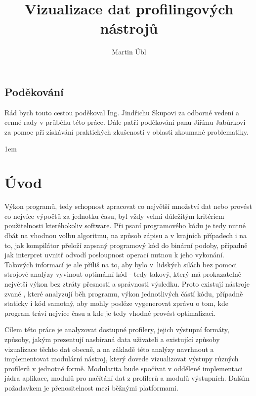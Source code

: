 \documentclass[czech,BP]{thesiskiv}
\author{Martin Úbl}
\title{Vizualizace dat profilingových nástrojů}
\begin{document}
\pagestyle{fancy}

\newcommand{\tick}{\ding{52}}
\newcommand{\tickcross}{\ding{55}}
\renewcommand{\chaptermark}[1]{\markboth{\textit{#1}}{}}
\renewcommand{\sectionmark}[1]{\markright{\textit{#1}}{}}
\cfoot{\thepage}
\lhead{\leftmark}
\rhead{\rightmark}
\maketitle

\thispagestyle{empty}
\section*{Poděkování}
Rád bych touto cestou poděkoval Ing. Jindřichu Skupovi za odborné vedení a cenné rady v průběhu této práce. Dále patří poděkování panu Jiřímu Jabůrkovi za pomoc při získávání praktických zkušeností v oblasti zkoumané problematiky.


\tableofcontents
\pagestyle{fancy}
\renewcommand{\chaptermark}[1]{\markboth{\textit{#1}}{}}
\renewcommand{\sectionmark}[1]{\markright{\textit{#1}}{}}
\cfoot{\thepage}
\lhead{\leftmark}
\rhead{\rightmark}
\parskip 1em

\newpage

\chapter{Úvod}
Výkon programů, tedy schopnost zpracovat co největší množství dat nebo provést co nejvíce výpočtů za jednotku času, byl vždy velmi důležitým kritériem použitelnosti kteréhokoliv software. Při psaní programového kódu je tedy nutné dbát na vhodnou volbu algoritmu, na způsob zápisu a v krajních případech i na to, jak kompilátor přeloží zapsaný programový kód do binární podoby, případně jak interpret uvnitř odvodí posloupnost operací nutnou k jeho vykonání. Takových informací je ale příliš na to, aby bylo v~lidských silách bez pomoci strojové analýzy vyvinout optimální kód - tedy takový, který má prokazatelně největší výkon bez ztráty přesnosti a správnosti výsledku. Proto existují nástroje zvané , které analyzují běh programu, výkon jednotlivých částí kódu, případně staticky i kód samotný, aby mohly posléze vygenerovat zprávu o tom, kde program tráví nejvíce času a kde je tedy vhodné provést optimalizaci. 

Cílem této práce je analyzovat dostupné profilery, jejich výstupní formáty, způsoby, jakým prezentují nasbíraná data uživateli a existující způsoby vizualizace těchto dat obecně, a na základě této analýzy navrhnout a implementovat modulární nástroj, který dovede vizualizovat výstupy různých profilerů v jednotné formě. Modularita bude spočívat v oddělené implementaci jádra aplikace, modulů pro načítání dat z profilerů a modulů výstupních. Dalším požadavkem je přenositelnost mezi běžnými platformami.
\end{document}
